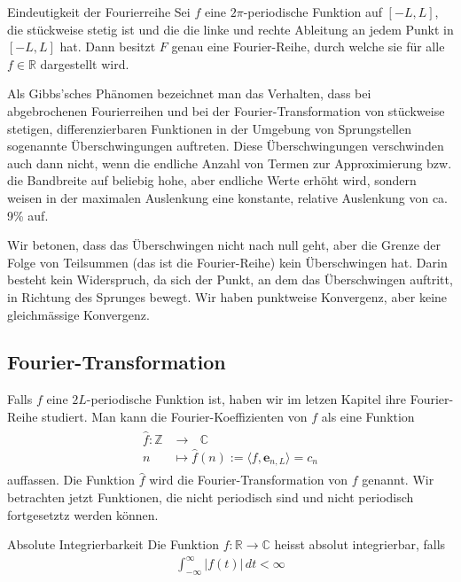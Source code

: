 \documentclass[a4paper,10pt]{article}
\begin{document}
\begin{subbox}{Eindeutigkeit der Fourierreihe}
  Sei \(f\) eine \(2\pi\)-periodische Funktion auf \([-L,L]\), die stückweise stetig ist und die die linke und rechte Ableitung an jedem Punkt in \([-L,L]\) hat. Dann besitzt \(F\) genau eine Fourier-Reihe, durch welche sie für alle \(f\in\mathbb{R}\) dargestellt wird.
\end{subbox}

Als Gibbs'sches Phänomen bezeichnet man das Verhalten, dass bei abgebrochenen Fourierreihen und bei der Fourier-Transformation von stückweise stetigen, differenzierbaren Funktionen in der Umgebung von Sprungstellen sogenannte Überschwingungen auftreten. Diese Überschwingungen verschwinden auch dann nicht, wenn die endliche Anzahl von Termen zur Approximierung bzw. die Bandbreite auf beliebig hohe, aber endliche Werte erhöht wird, sondern weisen in der maximalen Auslenkung eine konstante, relative Auslenkung von ca. 9\% auf.

Wir betonen, dass das Überschwingen nicht nach null geht, aber die Grenze der Folge von Teilsummen (das ist die Fourier-Reihe) kein Überschwingen hat. Darin besteht kein Widerspruch, da sich der Punkt, an dem das Überschwingen auftritt, in Richtung des Sprunges bewegt. Wir haben punktweise Konvergenz, aber keine gleichmässige Konvergenz.

\subsection{Fourier-Transformation}

Falls \(f\) eine \(2L\)-periodische Funktion ist, haben wir im letzen Kapitel ihre Fourier-Reihe studiert. Man kann die Fourier-Koeffizienten von \(f\) als eine Funktion \begin{align*} \begin{aligned} \hat f\colon\mathbb{Z}&\longrightarrow~~~\mathbb{C}\\ n&\mapsto \hat f( n ):=\langle f,\mathbf{e}_{n,L}\rangle=c_n \end{aligned} \end{align*} auffassen. Die Funktion \(\hat f\) wird die Fourier-Transformation von \(f\) genannt. Wir betrachten jetzt Funktionen, die nicht periodisch sind und nicht periodisch fortgesetztz werden können.

\begin{subbox}{Absolute Integrierbarkeit}
  Die Funktion \(f\colon\mathbb{R}\to\mathbb{C}\) heisst absolut integrierbar, falls \begin{align*} \int_{-\infty}^\infty |f(t)|\,dt<\infty \end{align*}
\end{subbox}
\end{document}
